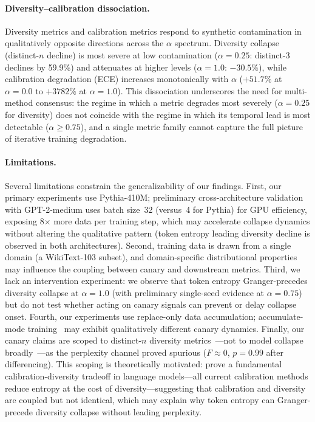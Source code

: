 \paragraph{Diversity--calibration dissociation.}
Diversity metrics and calibration metrics respond to synthetic contamination in qualitatively opposite directions across the $\alpha$ spectrum.
Diversity collapse (distinct-$n$ decline) is most severe at low contamination ($\alpha{=}0.25$: distinct-3 declines by 59.9\%) and attenuates at higher levels ($\alpha{=}1.0$: $-30.5\%$), while calibration degradation (ECE) increases monotonically with $\alpha$ ($+51.7\%$ at $\alpha{=}0.0$ to $+3782\%$ at $\alpha{=}1.0$).
This dissociation underscores the need for multi-method consensus: the regime in which a metric degrades most severely ($\alpha{=}0.25$ for diversity) does not coincide with the regime in which its temporal lead is most detectable ($\alpha{\geq}0.75$), and a single metric family cannot capture the full picture of iterative training degradation.

\paragraph{Limitations.}
Several limitations constrain the generalizability of our findings.
First, our primary experiments use Pythia-410M; preliminary cross-architecture validation with GPT-2-medium uses batch size~32 (versus~4 for Pythia) for GPU efficiency, exposing 8$\times$ more data per training step, which may accelerate collapse dynamics without altering the qualitative pattern (token entropy leading diversity decline is observed in both architectures).
Second, training data is drawn from a single domain (a WikiText-103 subset), and domain-specific distributional properties may influence the coupling between canary and downstream metrics.
Third, we lack an intervention experiment: we observe that token entropy Granger-precedes diversity collapse at $\alpha{=}1.0$ (with preliminary single-seed evidence at $\alpha{=}0.75$) but do not test whether acting on canary signals can prevent or delay collapse onset.
Fourth, our experiments use replace-only data accumulation; accumulate-mode training~\cite{dey2024breaking,kazdan2025collapse} may exhibit qualitatively different canary dynamics.
Finally, our canary claims are scoped to distinct-$n$ diversity metrics~\cite{li2016diversity}---not to model collapse broadly~\cite{schaeffer2025position}---as the perplexity channel proved spurious ($F{\approx}0$, $p{=}0.99$ after differencing).
This scoping is theoretically motivated: \citet{cao2025entropycal} prove a fundamental calibration-diversity tradeoff in language models---all current calibration methods reduce entropy at the cost of diversity---suggesting that calibration and diversity are coupled but not identical, which may explain why token entropy can Granger-precede diversity collapse without leading perplexity.

